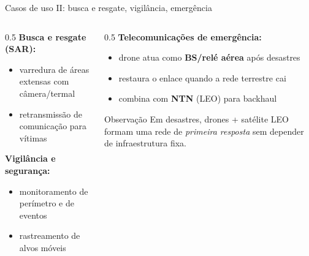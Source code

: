 \documentclass[aspectratio=169,11pt]{beamer}
\begin{document}
\begin{frame}{Casos de uso II: busca e resgate, vigilância, emergência}
  \begin{columns}
    \begin{column}{0.5\textwidth}
      \textbf{Busca e resgate (SAR):}
      \begin{itemize}
        \item varredura de áreas extensas com câmera/termal
        \item retransmissão de comunicação para vítimas
      \end{itemize}
      \textbf{Vigilância e segurança:}
      \begin{itemize}
        \item monitoramento de perímetro e de eventos
        \item rastreamento de alvos móveis
      \end{itemize}
    \end{column}
    \begin{column}{0.5\textwidth}
      \textbf{Telecomunicações de emergência:}
      \begin{itemize}
        \item drone atua como \textbf{BS/relé aérea} após desastres
        \item restaura o enlace quando a rede terrestre cai
        \item combina com \textbf{NTN} (LEO) para backhaul
      \end{itemize}
      \begin{alertblock}{Observação}
        Em desastres, drones + satélite LEO formam uma rede de \emph{primeira resposta} sem depender de infraestrutura fixa.
      \end{alertblock}
    \end{column}
  \end{columns}
\end{frame}
\end{document}
